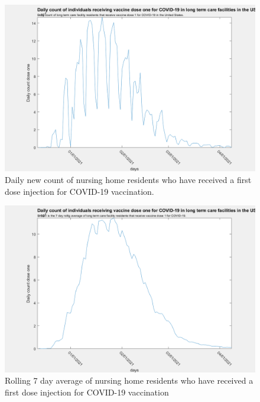 \documentclass[twoside]{article}
\begin{document}
\begin{multicols}{2}
\begin{figure}[H]
	\includegraphics[width=\linewidth]{images/usa_daily_ltc_first_dose_unprocessed.png}
	\caption{Daily new count of nursing home residents who have received a first dose injection for COVID-19 vaccination.}
	\label{fig:images/usa_daily_ltc_first_dose_unprocessedLabel}
\end{figure}

\begin{figure}[H]
	\includegraphics[width=\linewidth]{images/usa_daily_ltc_first_dose_processed.png}
	\caption{Rolling 7 day average of nursing home residents who have received a first dose injection for COVID-19 vaccination}
	\label{fig:images/usa_daily_ltc_first_dose_processedLabel}
\end{figure}


\end{multicols}
\end{document}
